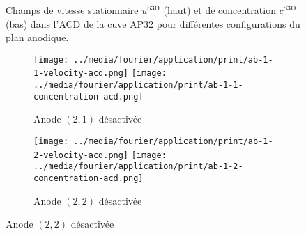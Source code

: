 \begin{figure}[h]
\begin{center}
    \caption{Champs de vitesse stationnaire $u^{\mathrm{S3D}}$ (haut) et de
      concentration $c^\mathrm{S3D}$ (bas) dans l'ACD de la cuve
      AP32 pour différentes configurations du plan anodique.}
    \label{fig:f3d-deactivated-a}
  \end{center}
\end{figure}

\begin{figure}[h]
  \begin{center}
    \begin{subfigure}[t]{\textwidth}
      \begin{center}
        \texttt{[image: ../media/fourier/application/print/ab-1-1-velocity-acd.png]}
        \texttt{[image: ../media/fourier/application/print/ab-1-1-concentration-acd.png]}
        \caption{Anode $(2,1)$ désactivée}
      \end{center}
    \end{subfigure}
    \begin{subfigure}[t]{\textwidth}
      \begin{center}
        \texttt{[image: ../media/fourier/application/print/ab-1-2-velocity-acd.png]}
        \texttt{[image: ../media/fourier/application/print/ab-1-2-concentration-acd.png]}
        \caption{Anode $(2,2)$ désactivée}
      \end{center}
    \end{subfigure}


\end{center}
\end{figure}
